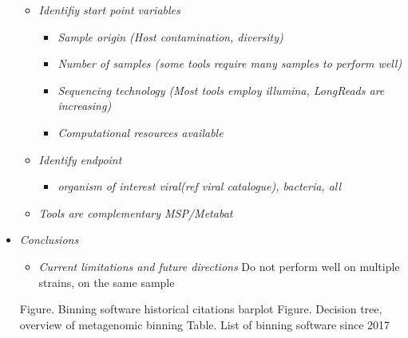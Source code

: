 \documentclass{article}
\begin{document}
\begin{itemize}
         \begin{itemize}
	  \item\emph{Identifiy start point variables} 
          	\begin{itemize}
      			\item\emph{Sample origin (Host contamination, diversity)} 
                	 \item\emph{Number of samples (some tools require many samples to perform well)} 
                	 \item\emph{Sequencing technology (Most tools employ illumina, LongReads are increasing) }
                	 \item\emph{Computational resources available }
		\end{itemize}
         \item\emph{Identify endpoint} 
		\begin{itemize}
			\item\emph{organism of interest viral(ref viral catalogue), bacteria, all} 
          	\end{itemize}       
         \item\emph{Tools are complementary MSP/Metabat} 
         \end{itemize} 
 \item\emph{Conclusions} 
         	\begin{itemize}
		\item\emph{Current limitations and future directions} 
                 Do not perform well on multiple strains, on the same sample 
 		\end{itemize}
 Figure. Binning software historical citations barplot 
 Figure. Decision tree, overview of metagenomic binning 
 Table. List of binning software since 2017                  
\end{itemize}
\end{document}
